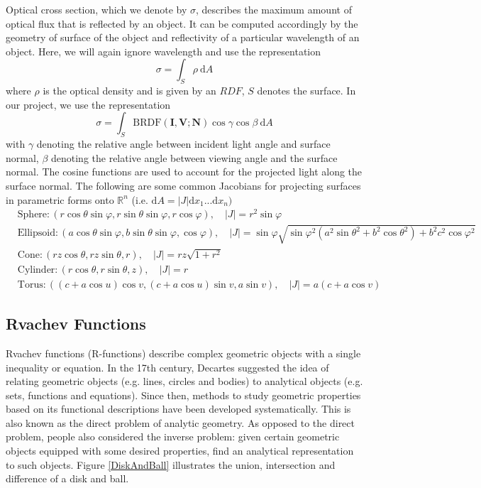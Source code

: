 \documentclass[11pt,reqno]{amsart}
\newcommand{\BRDF}{\mathrm{BRDF}}
\theoremstyle{definition}
\begin{document}
Optical cross section, which we denote by $\sigma$, describes the maximum amount of optical flux that is reflected by an object. It can be computed accordingly by the geometry of surface of the object and reflectivity of a particular wavelength of an object. Here, we will again ignore wavelength and use the representation 
$$\sigma=\int_{S} \rho \: \mathrm{d}A$$
where $\rho$ is the optical density and is given by an $RDF$, $S$ denotes the surface. In our project, we use the representation
$$\sigma= \int_S\BRDF(\mathbf{I},\mathbf{V};\mathbf{N}) \cos\gamma\cos\beta \: \mathrm{d}A$$
with $\gamma$ denoting the relative angle between incident light angle and surface normal, $\beta$ denoting the relative angle between viewing angle and the surface normal. The cosine functions are used to account for the projected light along the surface normal. The following are some common Jacobians for projecting surfaces in parametric forms onto $\mathbb{R}^n$ (i.e. $\mathrm d A= |J| \mathrm{d}x_1...\mathrm{d}x_n)$
\begin{align}
&\nonumber\mbox{Sphere}:( r\cos\theta \sin\varphi, r\sin\theta \sin\varphi,  r\cos\varphi),   \quad |J|= r^2\sin\varphi         \\
&\nonumber\mbox{Ellipsoid} :(a\cos\theta \sin\varphi,b\sin\theta \sin\varphi,\cos\varphi),    \quad |J|=\sin\varphi  \sqrt{\sin\varphi^2( a^2\sin\theta^2+b^2\cos\theta^2)+b^2c^2\cos\varphi^2}       \\ 
&\nonumber\mbox{Cone}: (rz\cos\theta , rz\sin\theta , r),\quad |J|= rz\sqrt{1+r^2}        \\
&\nonumber\mbox{Cylinder}: ( r\cos\theta ,r\sin\theta, z), \quad |J|=r                \\
&\nonumber\mbox{Torus} :    ((c+a\cos u) \cos v,(c+a\cos u) \sin v, a\sin v), \quad |J|= a(c+a\cos v)           
\end{align}

\subsection{Rvachev Functions}
Rvachev functions (R-functions) describe complex geometric objects with a single inequality or equation. In the
17th century, Decartes suggested the idea of relating geometric objects (e.g.
lines, circles and bodies) to analytical objects (e.g. sets, functions and
equations). Since then, methods to study geometric properties based on its
functional descriptions have been developed systematically. This is also known
as the direct problem of analytic geometry. As opposed to the direct problem,
people also considered the inverse problem: given certain geometric objects
equipped with some desired properties, find an analytical representation to
such objects. Figure \ref{DiskAndBall} illustrates the union, intersection and difference of a disk and ball. 
\end{document}
